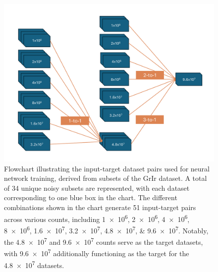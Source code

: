 \begin{figure}[h]
    \centering
    \includegraphics[width=1\linewidth]{images/training_flowchart.pdf}
    \caption{Flowchart illustrating the input-target dataset pairs used for neural network training, derived from subsets of the \gls{GrIr} dataset. A total of \num{34} unique noisy subsets are represented, with each dataset corresponding to one blue box in the chart. The different combinations shown in the chart generate \num{51} input-target pairs across various counts, including \numlist{1e6;2e6;4e6;8e6;1.6e7;3.2e7;4.8e7;9.6e7}. Notably, the \num{4.8e7} and \num{9.6e7} counts serve as the target datasets, with \num{9.6e7} additionally functioning as the target for the \num{4.8e7} datasets.}
    \label{fig:training-data}
\end{figure}